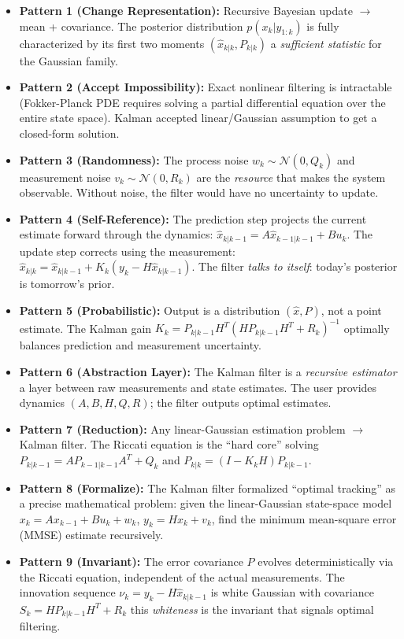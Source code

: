 \begin{itemize}
\item \textbf{Pattern 1 (Change Representation):} Recursive Bayesian update $\to$ mean + covariance. The posterior distribution $p(x_k | y_{1:k})$ is fully characterized by its first two moments $(\hat{x}_{k|k}, P_{k|k})$ a \emph{sufficient statistic} for the Gaussian family.

\item \textbf{Pattern 2 (Accept Impossibility):} Exact nonlinear filtering is intractable (Fokker-Planck PDE requires solving a partial differential equation over the entire state space). Kalman accepted linear/Gaussian assumption to get a closed-form solution.

\item \textbf{Pattern 3 (Randomness):} The process noise $w_k \sim \mathcal{N}(0, Q_k)$ and measurement noise $v_k \sim \mathcal{N}(0, R_k)$ are the \emph{resource} that makes the system observable. Without noise, the filter would have no uncertainty to update.

\item \textbf{Pattern 4 (Self-Reference):} The prediction step projects the current estimate forward through the dynamics: $\hat{x}_{k|k-1} = A\hat{x}_{k-1|k-1} + Bu_k$. The update step corrects using the measurement: $\hat{x}_{k|k} = \hat{x}_{k|k-1} + K_k(y_k - H\hat{x}_{k|k-1})$. The filter \emph{talks to itself}: today's posterior is tomorrow's prior.

\item \textbf{Pattern 5 (Probabilistic):} Output is a distribution $(\hat{x}, P)$, not a point estimate. The Kalman gain $K_k = P_{k|k-1}H^T(H P_{k|k-1}H^T + R_k)^{-1}$ optimally balances prediction and measurement uncertainty.

\item \textbf{Pattern 6 (Abstraction Layer):} The Kalman filter is a \emph{recursive estimator} a layer between raw measurements and state estimates. The user provides dynamics $(A, B, H, Q, R)$; the filter outputs optimal estimates.

\item \textbf{Pattern 7 (Reduction):} Any linear-Gaussian estimation problem $\to$ Kalman filter. The Riccati equation is the ``hard core'' solving $P_{k|k-1} = AP_{k-1|k-1}A^T + Q_k$ and $P_{k|k} = (I - K_kH)P_{k|k-1}$.

\item \textbf{Pattern 8 (Formalize):} The Kalman filter formalized ``optimal tracking'' as a precise mathematical problem: given the linear-Gaussian state-space model $x_k = Ax_{k-1} + Bu_k + w_k$, $y_k = Hx_k + v_k$, find the minimum mean-square error (MMSE) estimate recursively.

\item \textbf{Pattern 9 (Invariant):} The error covariance $P$ evolves deterministically via the Riccati equation, independent of the actual measurements. The innovation sequence $\nu_k = y_k - H\hat{x}_{k|k-1}$ is white Gaussian with covariance $S_k = HP_{k|k-1}H^T + R_k$ this \emph{whiteness} is the invariant that signals optimal filtering.
\end{itemize}

